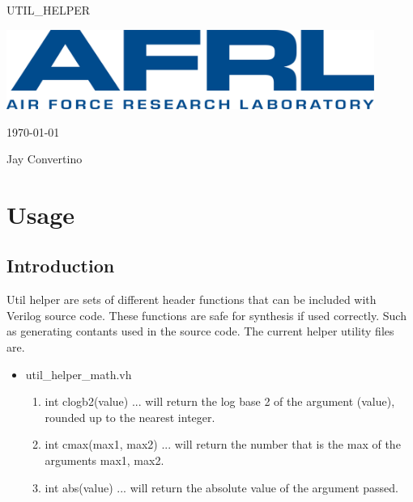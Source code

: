 \begin{titlepage}
  \begin{center}

  {\Huge UTIL\_HELPER}

  \vspace{25mm}

  \includegraphics[width=0.90\textwidth,height=\textheight,keepaspectratio]{img/AFRL.png}

  \vspace{25mm}

  \today

  \vspace{15mm}

  {\Large Jay Convertino}

  \end{center}
\end{titlepage}

\tableofcontents

\newpage

\section{Usage}

\subsection{Introduction}

\par
Util helper are sets of different header functions that can be included with Verilog source code. These functions
are safe for synthesis if used correctly. Such as generating contants used in the source code. The current helper
utility files are.

\begin{itemize}
\item util\_helper\_math.vh
  \begin{enumerate}
    \item int clogb2(value) ... will return the log base 2 of the argument (value), rounded up to the nearest integer.
    \item int cmax(max1, max2) ... will return the number that is the max of the arguments max1, max2.
    \item int abs(value) ... will return the absolute value of the argument passed.
  \end{enumerate}
\end{itemize}

